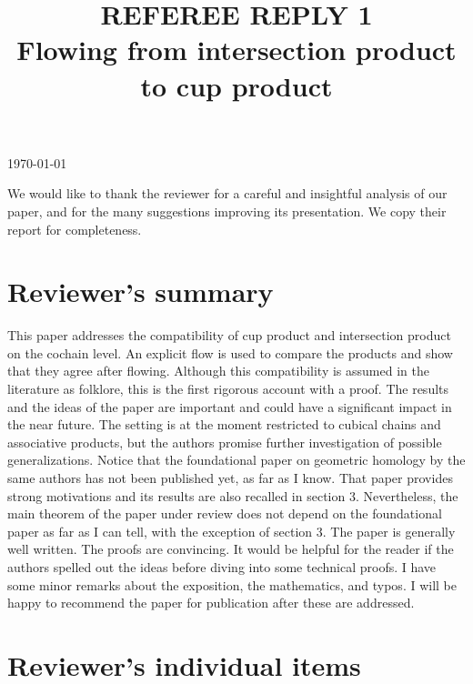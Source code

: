 \documentclass{amsart}
\title[Referee reply]{REFEREE REPLY 1 \\ Flowing from intersection product to cup product}
\begin{document}
	\noindent\today
	\maketitle

	We would like to thank the reviewer for a careful and insightful analysis of our paper, and for the many suggestions improving its presentation.
	We copy their report for completeness.

	\section{Reviewer's summary}

	\noindent This paper addresses the compatibility of cup product and intersection product on the cochain level. An explicit flow is used to compare the products and show that they agree after flowing. Although this compatibility is assumed in the literature as folklore, this is the first rigorous account with a proof. The results and the ideas of the paper are important and could have a significant impact in the near future. The setting is at the moment restricted to cubical chains and associative products, but the authors promise further investigation of possible generalizations. Notice that the foundational paper on geometric homology by the same authors has not been published yet, as far as I know. That paper provides strong motivations and its results are also recalled in section 3. Nevertheless, the main theorem of the paper under review does not depend on the foundational paper as far as I can tell, with the exception of section 3. The paper is generally well written. The proofs are convincing. It would be helpful for the reader if the authors spelled out the ideas before diving into some technical proofs. I have some minor remarks about the exposition, the mathematics, and typos. I will be happy to recommend the paper for publication after these are addressed.

	\section{Reviewer's individual items}
\end{document}
